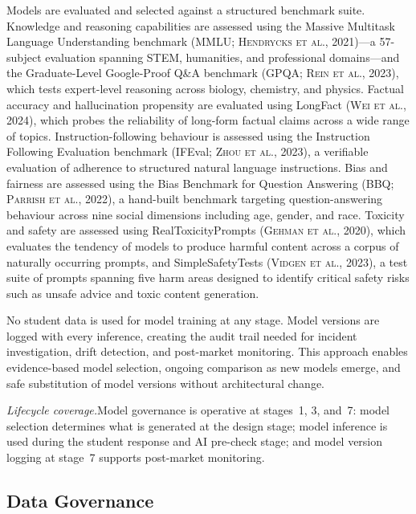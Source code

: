 \documentclass[10pt, a4paper, twocolumn]{article}
\begin{document}
Models are evaluated and selected against a structured benchmark suite. Knowledge and
reasoning capabilities are assessed using the Massive Multitask Language Understanding
benchmark (MMLU; \textsc{Hendrycks et al.}, 2021)---a 57-subject evaluation spanning
STEM, humanities, and professional domains---and the Graduate-Level Google-Proof Q\&A
benchmark (GPQA; \textsc{Rein et al.}, 2023), which tests expert-level reasoning across
biology, chemistry, and physics. Factual accuracy and hallucination propensity are
evaluated using LongFact (\textsc{Wei et al.}, 2024), which probes the reliability of
long-form factual claims across a wide range of topics. Instruction-following behaviour
is assessed using the Instruction Following Evaluation benchmark (IFEval;
\textsc{Zhou et al.}, 2023), a verifiable evaluation of adherence to structured natural
language instructions. Bias and fairness are assessed using the Bias Benchmark for
Question Answering (BBQ; \textsc{Parrish et al.}, 2022), a hand-built benchmark
targeting question-answering behaviour across nine social dimensions including age,
gender, and race. Toxicity and safety are assessed using RealToxicityPrompts
(\textsc{Gehman et al.}, 2020), which evaluates the tendency of models to produce
harmful content across a corpus of naturally occurring prompts, and SimpleSafetyTests
(\textsc{Vidgen et al.}, 2023), a test suite of prompts spanning five harm areas
designed to identify critical safety risks such as unsafe advice and toxic content
generation.

No student data is used for model training at any stage. Model versions are logged
with every inference, creating the audit trail needed for incident investigation,
drift detection, and post-market monitoring. This approach enables evidence-based
model selection, ongoing comparison as new models emerge, and safe substitution of
model versions without architectural change.

\textit{Lifecycle coverage.}\quad Model governance is operative at stages~1, 3,
and~7: model selection determines what is generated at the design stage; model
inference is used during the student response and AI pre-check stage; and model
version logging at stage~7 supports post-market monitoring.

\subsection{Data Governance}
\end{document}
